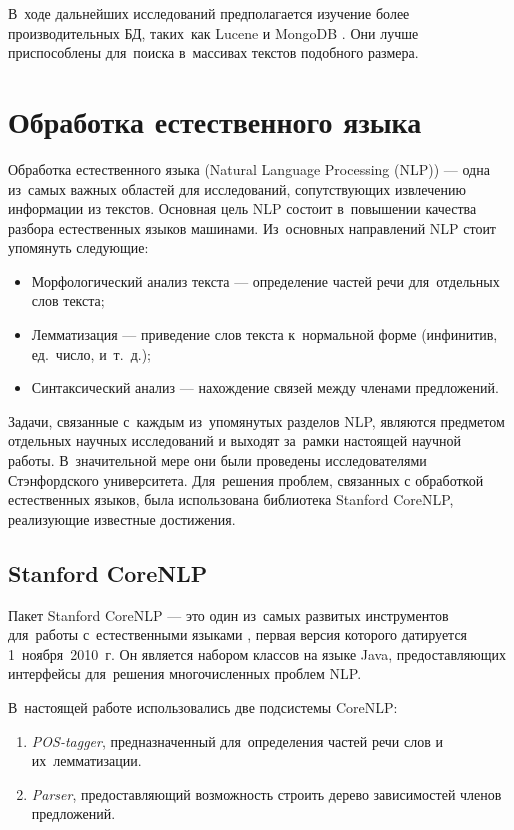 В~ходе дальнейших исследований предполагается изучение более производительных БД, таких~как 
Lucene \cite{lucene} и 
MongoDB \cite{mongodb}. 
Они лучше приспособлены для~поиска в~массивах текстов подобного размера.

\section{Обработка естественного языка}

Обработка естественного языка (Natural Language Processing (NLP))\cite{textminingsurvey} --- 
одна из~самых важных областей для исследований, сопутствующих извлечению информации из текстов.
Основная цель NLP состоит в~повышении качества разбора естественных языков машинами.
Из~основных направлений NLP стоит упомянуть следующие:

\begin{itemize}

\item {Морфологический анализ текста --- определение частей речи для~отдельных слов текста;}
\item {Лемматизация --- приведение слов текста к~нормальной форме (инфинитив, ед.~число, и~т.~д.);}
\item {Синтаксический анализ --- нахождение связей между членами предложений.}

\end{itemize}

Задачи, связанные с~каждым из~упомянутых разделов NLP, 
являются предметом отдельных научных исследований и выходят за~рамки настоящей научной работы.
В~значительной мере они были проведены исследователями Стэнфордского университета. 
Для~решения проблем, связанных с обработкой естественных языков, была использована библиотека  Stanford CoreNLP,
реализующие известные достижения.

\subsection{Stanford CoreNLP}
\label{st_corenlp}

Пакет Stanford CoreNLP --- это один из~самых развитых инструментов для~работы с~естественными языками \cite{corenlp}, 
первая версия которого датируется 1~ноября~2010~г.
Он является набором классов на языке Java, предоставляющих интерфейсы для~решения многочисленных проблем NLP. 

В~настоящей работе использовались две подсистемы CoreNLP:

\begin{enumerate}

\item {{\it POS-tagger}, предназначенный для~определения частей речи слов и их~лемматизации.}
\item {{\it Parser}, предоставляющий возможность строить дерево зависимостей членов предложений.}

\end{enumerate}

